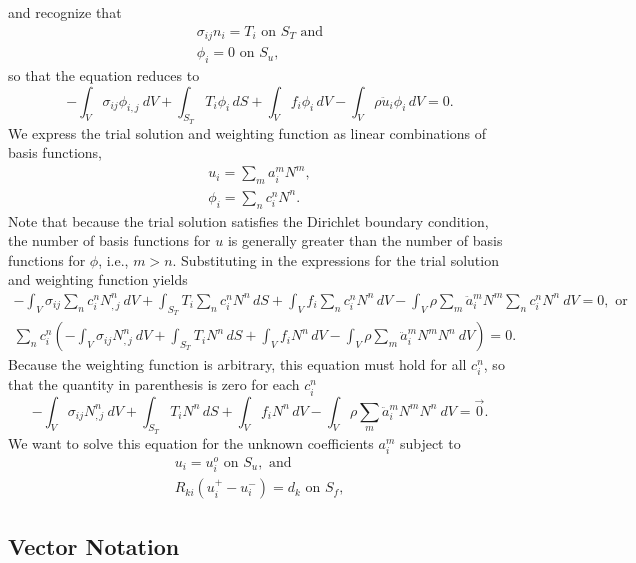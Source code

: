 and recognize that
\begin{gather}
\sigma_{ij}n_{i}=T_{i}\text{ on }S_{T}\text{ and}\\
\phi_{i}=0\text{ on }S_{u},
\end{gather}
so that the equation reduces to
\begin{equation}
\label{eq:elasticity:integral}
-\int_{V}\sigma_{ij}\phi_{i,j}\: dV+\int_{S_{T}}T_{i}\phi_{i}\, dS+\int_{V}f_{i}\phi_{i}\, dV-\int_{V}\rho\ddot{u}_{i}\phi_{i}\, dV=0.
\end{equation}
We express the trial solution and weighting function as linear combinations
of basis functions,
\begin{gather}
u_{i}=\sum_{m}a_{i}^{m}N^{m},\\
\phi_{i}=\sum_{n}c_{i}^{n}N^{n}.
\end{gather}
Note that because the trial solution satisfies the Dirichlet boundary
condition, the number of basis functions for $u$ is generally greater
than the number of basis functions for $\phi$, i.e., $m>n$. Substituting
in the expressions for the trial solution and weighting function yields
\begin{gather}
-\int_{V}\sigma_{ij}\sum_{n}c_{i}^{n}N_{,j}^{n}\: dV+\int_{S_{T}}T_{i}\sum_{n}c_{i}^{n}N^{n}\, dS+\int_{V}f_{i}\sum_{n}c_{i}^{n}N^{n}\, dV-\int_{V}\rho\sum_{m}\ddot{a}_{i}^{m}N^{m}\sum_{n}c_{i}^{n}N^{n}\ dV=0,\text{ or}\\
\sum_{n}c_{i}^{n}(-\int_{V}\sigma_{ij}N_{,j}^{n}\: dV+\int_{S_{T}}T_{i}N^{n}\, dS+\int_{V}f_{i}N^{n}\, dV-\int_{V}\rho\sum_{m}\ddot{a}_{i}^{m}N^{m}N^{n}\ dV)=0.
\end{gather}
 Because the weighting function is arbitrary, this equation must hold
for all $c_{i}^{n}$, so that the quantity in parenthesis is zero
for each $c_{i}^{n}$
\begin{equation}
\label{eq:elasticity:integral:discretized}
-\int_{V}\sigma_{ij}N_{,j}^{n}\: dV+\int_{S_{T}}T_{i}N^{n}\, dS+\int_{V}f_{i}N^{n}\, dV-\int_{V}\rho\sum_{m}\ddot{a}_{i}^{m}N^{m}N^{n}\ dV=\vec{0}.
\end{equation}
We want to solve this equation for the unknown coefficients $a_{i}^{m}$
subject to
\begin{gather}
u_{i}=u_{i}^{o}\text{ on }S_{u},\text{ and}\\
R_{ki}(u_{i}^{+}-u_{i}^{-})=d_{k}\text{ on }S_{f},
\end{gather}


\subsection{Vector Notation}

